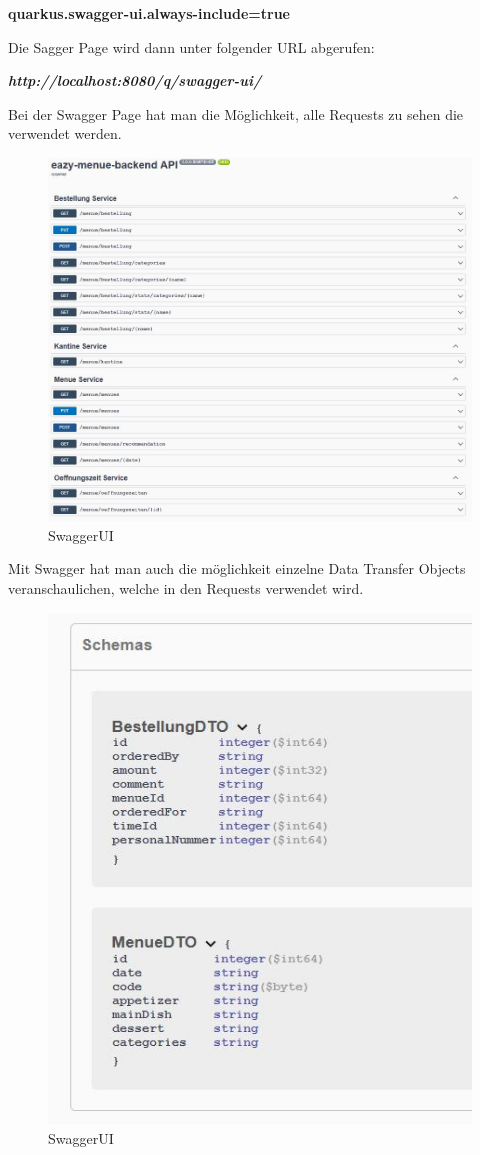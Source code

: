 \textbf{quarkus.swagger-ui.always-include=true}

Die Sagger Page wird dann unter folgender URL abgerufen: 

\textbf{\textit{http://localhost:8080/q/swagger-ui/ }}

Bei der Swagger Page hat man die Möglichkeit, alle Requests zu sehen die verwendet werden.

\begin{figure}[htp]
    \author{David Ignjatovic}
    \centering
    \includegraphics[scale=0.60]{pics/swagger.jpg}
    \caption{SwaggerUI}
    \label{fig:impl:swagger}
\end{figure}

Mit Swagger hat man auch die möglichkeit einzelne Data Transfer Objects veranschaulichen, welche in den Requests verwendet wird.

\begin{figure}[htp]
    \author{David Ignjatovic}
    \centering
    \includegraphics[scale=0.90]{pics/swagger-schema.jpg}
    \caption{SwaggerUI}
    \label{fig:impl:swagger-schema}
\end{figure}





